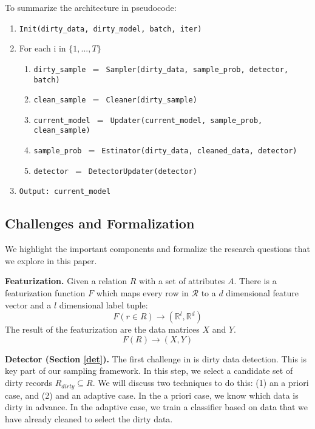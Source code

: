 To summarize the architecture in pseudocode:
\begin{enumerate}\scriptsize\sloppy
\item \texttt{Init(dirty\_data, dirty\_model, batch, iter)}
\item For each i in $\{1,...,T\}$
\begin{enumerate}
	\item \texttt{dirty\_sample $=$ Sampler(dirty\_data, sample\_prob, detector, batch)}
	\item \texttt{clean\_sample $=$ Cleaner(dirty\_sample)}
	\item \texttt{current\_model $=$ Updater(current\_model, sample\_prob, clean\_sample)}
	\item \texttt{sample\_prob $=$ Estimator(dirty\_data, cleaned\_data, detector)}
	\item \texttt{detector $=$ DetectorUpdater(detector)}
\end{enumerate}
\item \texttt{Output: current\_model}
\end{enumerate}

\subsection{Challenges and Formalization}
We highlight the important components and formalize the research questions that we explore in this paper. 

\vspace{0.5em}

\noindent \textbf{Featurization. } Given a relation $R$ with a set of attributes $A$.
There is a featurization function $F$ which maps every row in $\mathcal{R}$ to a $d$ dimensional feature vector and a $l$ dimensional label tuple: 
\[F(r \in R) \rightarrow (\mathbb{R}^l, \mathbb{R}^d)\]
The result of the featurization are the data matrices $X$ and $Y$.
\[
F(R)\rightarrow (X,Y)
\]

\vspace{0.5em}

\noindent\textbf{Detector (Section \ref{det}). } The first challenge in \sys is dirty data detection. This is key part of our sampling framework. In this step, we select a candidate set of dirty records $R_{dirty} \subseteq R$. We will discuss two techniques to do this: (1) an a priori case, and (2) and an adaptive case. In the a priori case, we know which data is dirty in advance. In the adaptive case, we train a classifier based on data that we have already cleaned to select the dirty data.

